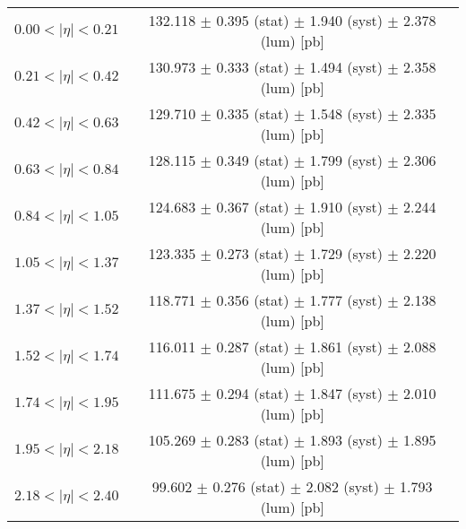 \begin{tabular}{lc}
\hline
$0.00 < |\eta| <0.21$          & 132.118 $\pm$ 0.395 (stat) $\pm$ 1.940 (syst) $\pm$ 2.378 (lum) [pb]  \\
$0.21 < |\eta| <0.42$          & 130.973 $\pm$ 0.333 (stat) $\pm$ 1.494 (syst) $\pm$ 2.358 (lum) [pb]  \\
$0.42 < |\eta| <0.63$          & 129.710 $\pm$ 0.335 (stat) $\pm$ 1.548 (syst) $\pm$ 2.335 (lum) [pb]  \\
$0.63 < |\eta| <0.84$          & 128.115 $\pm$ 0.349 (stat) $\pm$ 1.799 (syst) $\pm$ 2.306 (lum) [pb]  \\
$0.84 < |\eta| <1.05$          & 124.683 $\pm$ 0.367 (stat) $\pm$ 1.910 (syst) $\pm$ 2.244 (lum) [pb]  \\
$1.05 < |\eta| <1.37$          & 123.335 $\pm$ 0.273 (stat) $\pm$ 1.729 (syst) $\pm$ 2.220 (lum) [pb]  \\
$1.37 < |\eta| <1.52$          & 118.771 $\pm$ 0.356 (stat) $\pm$ 1.777 (syst) $\pm$ 2.138 (lum) [pb]  \\
$1.52 < |\eta| <1.74$          & 116.011 $\pm$ 0.287 (stat) $\pm$ 1.861 (syst) $\pm$ 2.088 (lum) [pb]  \\
$1.74 < |\eta| <1.95$          & 111.675 $\pm$ 0.294 (stat) $\pm$ 1.847 (syst) $\pm$ 2.010 (lum) [pb]  \\
$1.95 < |\eta| <2.18$          & 105.269 $\pm$ 0.283 (stat) $\pm$ 1.893 (syst) $\pm$ 1.895 (lum) [pb]  \\
$2.18 < |\eta| <2.40$          & 99.602 $\pm$ 0.276 (stat) $\pm$ 2.082 (syst) $\pm$ 1.793 (lum) [pb]  \\
\hline
\end{tabular}

